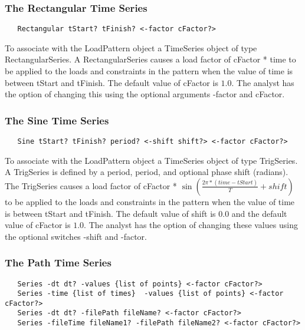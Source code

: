 \documentclass[12pt]{article}
\begin{document}
\subsubsection{The Rectangular Time Series}

{\sf\small
\begin{verbatim}
   Rectangular tStart? tFinish? <-factor cFactor?> 
\end{verbatim}
}

\noindent To associate with the LoadPattern object a TimeSeries object
of type RectangularSeries. A RectangularSeries causes a load factor of
cFactor * time to be applied to the loads and constraints in the
pattern when the value of time is between tStart and tFinish. The
default value of cFactor is $1.0$. The analyst has the option of
changing this using the optional arguments -factor and cFactor. 

\subsubsection{The Sine Time Series}

{\sf\small
\begin{verbatim}
   Sine tStart? tFinish? period? <-shift shift?> <-factor cFactor?> 
\end{verbatim}
}

\noindent To associate with the LoadPattern object a TimeSeries object
of type TrigSeries. A TrigSeries is defined by a period, period, and optional
phase shift (radians). The TrigSeries causes a load factor of
cFactor * $\sin(\frac{2\pi*(time-tStart)}{T} + shift)$ to be applied
to the loads and constraints in the pattern when the value of time is
between tStart and tFinish. The default value of shift is $0.0$ and
the default value of cFactor is $1.0$. The analyst has the option of
changing these values using the optional switches -shift and -factor. 

\subsubsection{The Path Time Series}

{\sf\small
\begin{verbatim}
   Series -dt dt? -values {list of points} <-factor cFactor?> 
   Series -time {list of times}  -values {list of points} <-factor cFactor?> 
   Series -dt dt? -filePath fileName? <-factor cFactor?> 
   Series -fileTime fileName1? -filePath fileName2? <-factor cFactor?> 
\end{verbatim}
}
\end{document}
